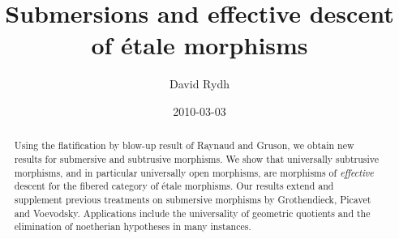 \documentclass[a4paper,twoside,11pt]{amsart}[2009/07/02] %
\newcommand{\etale}{\'{e}tale}
\begin{document}
\title[Submersions and effective descent of \'etale morphisms]
{Submersions and effective descent\\of \'etale morphisms}
\author{David Rydh}
\address{Department of Mathematics, University of California, Berkeley,
970 Evans Hall, Berkeley, CA 94720-3840 USA}
\date{2010-03-03}

\begin{abstract}
Using the flatification by blow-up result of Raynaud and Gruson, we obtain new
results for submersive and subtrusive morphisms. We show that universally
subtrusive morphisms, and in particular universally open morphisms, are
morphisms of \emph{effective} descent for the fibered category of \etale{}
morphisms. Our results extend and supplement previous treatments on submersive
morphisms by Grothendieck, Picavet and Voevodsky. Applications include the
universality of geometric quotients and the elimination of noetherian
hypotheses in many instances.
\end{abstract}

\maketitle

\end{document}
